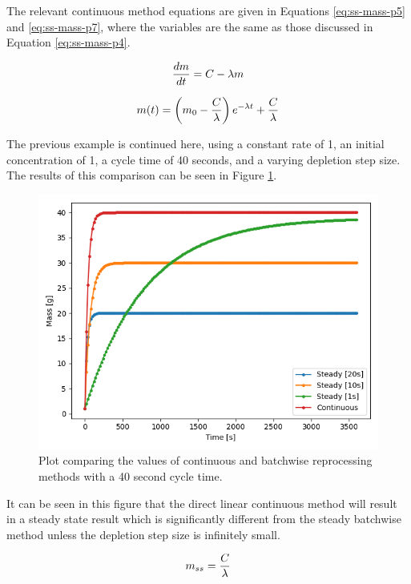 The relevant continuous method equations are given in Equations \eqref{eq:ss-mass-p5} and \eqref{eq:ss-mass-p7}, where the variables are the same as those discussed in Equation \eqref{eq:ss-mass-p4}.

\begin{equation} \hfill 
\frac{dm}{dt} = C - \lambda m
\hfill\label{eq:ss-mass-p5} \end{equation}


\begin{equation} \hfill 
m(t) = \left(m_0 - \frac{C}{\lambda} \right) e^{-\lambda t} + \frac{C}{\lambda}
\hfill\label{eq:ss-mass-p7} \end{equation}

The previous example is continued here, using a constant rate of 1, an initial concentration of 1, a cycle time of 40 seconds, and a varying depletion step size. The results of this comparison can be seen in Figure \ref{fig:steady_cont_repr_diff}.

\begin{figure}[H]
  \centering
  \includegraphics[scale=0.45]{images/dirlin-steady-comp.png}
  \caption{Plot comparing the values of continuous and batchwise reprocessing methods with a 40 second cycle time.}
   \label{fig:steady_cont_repr_diff}
\end{figure}


It can be seen in this figure that the direct linear continuous method will result in a steady state result which is significantly different from the steady batchwise method unless the depletion step size is infinitely small.

\begin{equation} \hfill 
m_{ss} = \frac{C}{\lambda}
\hfill\label{eq:ss-mass-cont} \end{equation}

